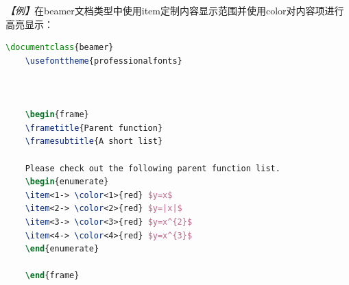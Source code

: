 \emph{【例】}在beamer文档类型中使用item定制内容显示范围并使用color对内容项进行高亮显示：
\begin{lstlisting}[language=TeX]
    \documentclass{beamer}
    \usefonttheme{professionalfonts}

    

    \begin{frame}
    \frametitle{Parent function}
    \framesubtitle{A short list}

    Please check out the following parent function list.
    \begin{enumerate}
    \item<1-> \color<1>{red} $y=x$
    \item<2-> \color<2>{red} $y=|x|$
    \item<3-> \color<3>{red} $y=x^{2}$
    \item<4-> \color<4>{red} $y=x^{3}$
    \end{enumerate}

    \end{frame}

    
\end{lstlisting}

